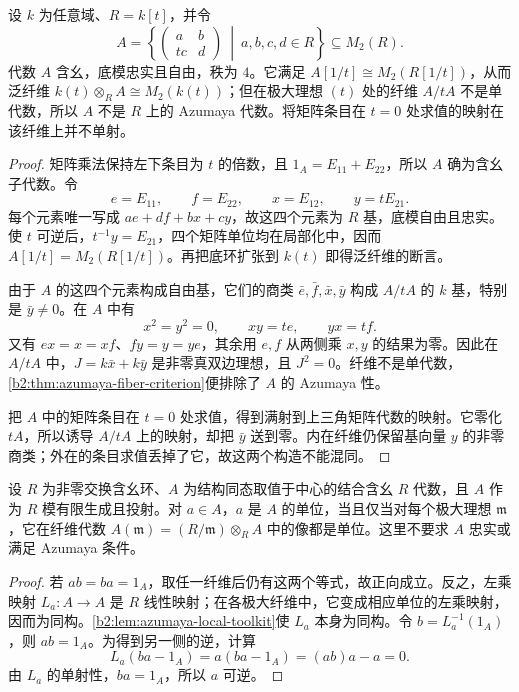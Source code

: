 \begin{proposition}\label{b2:prop:C-generic-fiber-insufficient}
	设 \(k\) 为任意域、\(R=k[t]\)，并令
	\[
		A=\left\{
		\begin{pmatrix}a&b\\tc&d\end{pmatrix}
		\ \middle|\ a,b,c,d\in R \right\}\subseteq M_2(R).
	\]
	代数 \(A\) 含幺，底模忠实且自由，秩为 \(4\)。它满足 \(A[1/t]\cong M_2(R[1/t])\)，从而泛纤维 \(k(t)\otimes_RA\cong M_2(k(t))\)；但在极大理想 \((t)\) 处的纤维 \(A/tA\) 不是单代数，所以 \(A\) 不是 \(R\) 上的 Azumaya 代数。将矩阵条目在 \(t=0\) 处求值的映射在该纤维上并不单射。
\end{proposition}
\begin{proof}
	矩阵乘法保持左下条目为 \(t\) 的倍数，且 \(1_A=E_{11}+E_{22}\)，所以 \(A\) 确为含幺子代数。令
	\[
		e=E_{11},\qquad f=E_{22},\qquad x=E_{12},\qquad y=tE_{21}.
	\]
	每个元素唯一写成 \(ae+df+bx+cy\)，故这四个元素为 \(R\) 基，底模自由且忠实。使 \(t\) 可逆后，\(t^{-1}y=E_{21}\)，四个矩阵单位均在局部化中，因而 \(A[1/t]=M_2(R[1/t])\)。再把底环扩张到 \(k(t)\) 即得泛纤维的断言。

	由于 \(A\) 的这四个元素构成自由基，它们的商类 \(\bar e,\bar f,\bar x,\bar y\) 构成 \(A/tA\) 的 \(k\) 基，特别是 \(\bar y\ne0\)。在 \(A\) 中有
	\[
		x^2=y^2=0,\qquad xy=te,\qquad yx=tf.
	\]
	又有 \(ex=x=xf\)、\(fy=y=ye\)，其余用 \(e,f\) 从两侧乘 \(x,y\) 的结果为零。因此在 \(A/tA\) 中，\(J=k\bar x+k\bar y\) 是非零真双边理想，且 \(J^2=0\)。纤维不是单代数，\cref{b2:thm:azumaya-fiber-criterion}便排除了 \(A\) 的 Azumaya 性。

	把 \(A\) 中的矩阵条目在 \(t=0\) 处求值，得到满射到上三角矩阵代数的映射。它零化 \(tA\)，所以诱导 \(A/tA\) 上的映射，却把 \(\bar y\) 送到零。内在纤维仍保留基向量 \(y\) 的非零商类；外在的条目求值丢掉了它，故这两个构造不能混同。
\end{proof}

\begin{proposition}[有限投射代数中的单位检验]\label{b2:prop:C-unit-fiber-criterion}
	设 \(R\) 为非零交换含幺环、\(A\) 为结构同态取值于中心的结合含幺 \(R\) 代数，且 \(A\) 作为 \(R\) 模有限生成且投射。对 \(a\in A\)，\(a\) 是 \(A\) 的单位，当且仅当对每个极大理想 \(\mathfrak m\)，它在纤维代数 \(A(\mathfrak m)=(R/\mathfrak m)\otimes_RA\) 中的像都是单位。这里不要求 \(A\) 忠实或满足 Azumaya 条件。
\end{proposition}
\begin{proof}
	若 \(ab=ba=1_A\)，取任一纤维后仍有这两个等式，故正向成立。反之，左乘映射 \(L_a:A\to A\) 是 \(R\) 线性映射；在各极大纤维中，它变成相应单位的左乘映射，因而为同构。\cref{b2:lem:azumaya-local-toolkit}使 \(L_a\) 本身为同构。令 \(b=L_a^{-1}(1_A)\)，则 \(ab=1_A\)。为得到另一侧的逆，计算
	\[
		L_a(ba-1_A)=a(ba-1_A)=(ab)a-a=0.
	\]
	由 \(L_a\) 的单射性，\(ba=1_A\)，所以 \(a\) 可逆。
\end{proof}
